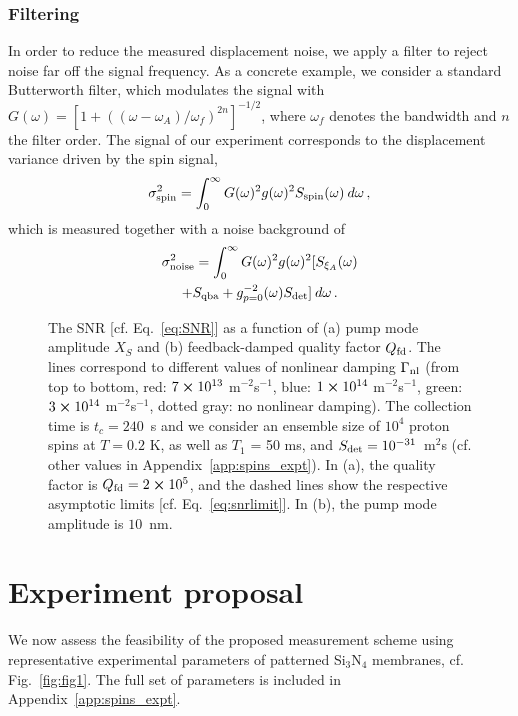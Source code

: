 \subsubsection{Filtering} In order to reduce the measured displacement noise, we apply a filter to reject noise far off the signal frequency. As a concrete example, we consider a standard Butterworth filter, which modulates the signal with $G(\omega) = [1 + ((\omega - \omega_A)/\omega_f)^{2 n}]^{-1/2}$, where $\omega_f$ denotes the bandwidth and $n$ the filter order. The signal of our experiment corresponds to the displacement variance driven by the spin signal,
\begin{equation} \label{eq:signal}
\sigma_{\rm spin}^2 = \int_{0}^{\infty} G(\omega)^2  g(\omega)^2 S_{\rm spin} (\omega) \: d\omega \,,
\end{equation}
which is measured together with a noise background of
\begin{equation} \label{eq:noise}
\begin{gathered}
\sigma_{\rm noise}^2 = \int_{0}^{\infty} G(\omega)^2 g(\omega)^2[S_{\xi_A}(\omega) \\+ S_{\rm qba} + g_{p=0}^{-2}(\omega) S_{\rm det}]\: d\omega \,.
\end{gathered}
\end{equation}


\begin{figure}
	\centering
	\hspace*{-5mm}
	
	\caption{The SNR [cf. Eq.~\eqref{eq:SNR}] as a function of (a) pump mode amplitude $X_S$ and (b) feedback-damped quality factor $Q_{\rm fd}$. The lines correspond to different values of nonlinear damping $\Gamma_{\rm nl}$ (from top to bottom, red: $7\cross10^{13}$ m$^{-2}$s$^{-1}$, blue: $1\cross10^{14}$ m$^{-2}$s$^{-1}$, green: $3\cross10^{14}$ m$^{-2}$s$^{-1}$, dotted gray: no nonlinear damping). The collection time is $t_c = 240$~s and we consider an ensemble size of $10^4$ proton spins at $T = 0.2$ K, as well as $T_1$ = 50 ms, and $S_{\rm det} =  10^{-31}$~m$^2$\;s (cf. other values in Appendix~\ref{app:spins_expt}). In (a), the quality factor is $Q_{\rm fd} =2 \cross 10^5$, and the dashed lines show the respective asymptotic limits [cf. Eq.~\eqref{eq:snrlimit}]. In (b), the pump mode amplitude is $10$~nm.}
	\label{fig:snr}
\end{figure}


\section{Experiment proposal} \label{sec:spins_disc}
We now assess the feasibility of the proposed measurement scheme using representative experimental parameters of patterned Si$_3$N$_4$ membranes, cf. Fig.~\ref{fig:fig1}. The full set of parameters is included in Appendix~\ref{app:spins_expt}.

